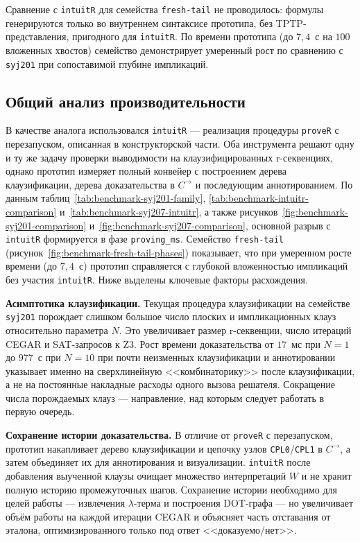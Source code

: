 \documentclass[14pt, russian]{scrartcl}
\begin{document}
Сравнение с \texttt{intuitR} для семейства \texttt{fresh-tail} не проводилось:
формулы генерируются только во внутреннем синтаксисе прототипа, без
TPTP-представления, пригодного для \texttt{intuitR}. По времени прототипа
(до $7{,}4$~с на $100$ вложенных хвостов) семейство демонстрирует умеренный
рост по сравнению с \texttt{syj201} при сопоставимой глубине импликаций.

\subsection{Общий анализ производительности}

В качестве аналога использовался \texttt{intuitR} --- реализация процедуры
\texttt{proveR} с перезапуском, описанная в конструкторской части. Оба
инструмента решают одну и ту же задачу проверки выводимости на
клаузифицированных r-секвенциях, однако прототип измеряет полный конвейер с
построением дерева клаузификации, дерева доказательства в $C^{\rightarrow}$ и
последующим аннотированием. По данным таблиц~\ref{tab:benchmark-syj201-family},
\ref{tab:benchmark-intuitr-comparison} и~\ref{tab:benchmark-syj207-intuitr}, а
также рисунков~\ref{fig:benchmark-syj201-comparison}
и~\ref{fig:benchmark-syj207-comparison}, основной разрыв с \texttt{intuitR}
формируется в фазе \texttt{proving\_ms}. Семейство \texttt{fresh-tail}
(рисунок~\ref{fig:benchmark-fresh-tail-phases}) показывает, что при умеренном
росте времени (до $7{,}4$~с) прототип справляется с глубокой вложенностью
импликаций без участия \texttt{intuitR}. Ниже выделены ключевые факторы расхождения.

\textbf{Асимптотика клаузификации.} Текущая процедура клаузификации на
  семействе \texttt{syj201} порождает слишком большое число плоских и
  импликационных клауз относительно параметра $N$. Это увеличивает размер
  r-секвенции, число итераций CEGAR и SAT-запросов к Z3. Рост времени
  доказательства от $17$~мс при $N = 1$ до $977$~с при $N = 10$ при почти
  неизменных клаузификации и аннотировании указывает именно на
  сверхлинейную <<комбинаторику>> после клаузификации, а не на постоянные
  накладные расходы одного вызова решателя. Сокращение числа порождаемых клауз
  --- направление, над которым следует работать в первую очередь.

\textbf{Сохранение истории доказательства.} В отличие от \texttt{proveR}
  с перезапуском, прототип накапливает дерево клаузификации и цепочку узлов
  \texttt{CPL0}/\texttt{CPL1} в $C^{\rightarrow}$, а затем объединяет их для
  аннотирования и визуализации. \texttt{intuitR} после добавления выученной
  клаузы очищает множество интерпретаций $W$ и не хранит полную историю
  промежуточных шагов. Сохранение истории необходимо для целей работы ---
  извлечения $\lambda$-терма и построения DOT-графа --- но увеличивает объём
  работы на каждой итерации CEGAR и объясняет часть отставания от эталона,
  оптимизированного только под ответ <<доказуемо/нет>>.
\end{document}
